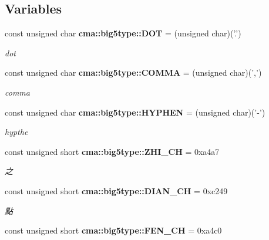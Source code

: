 \subsection*{Variables}
\begin{CompactItemize}
\item 
const unsigned char {\bf cma::big5type::DOT} = (unsigned char)('.')\label{namespacecma_1_1big5type_d58dfc7fdbe5d6db3b5b6dca9772457b}

\begin{CompactList}\small\item\em dot \item\end{CompactList}\item 
const unsigned char {\bf cma::big5type::COMMA} = (unsigned char)(',')\label{namespacecma_1_1big5type_a37bf289465759bf00ac522823ffe49a}

\begin{CompactList}\small\item\em comma \item\end{CompactList}\item 
const unsigned char {\bf cma::big5type::HYPHEN} = (unsigned char)('-')\label{namespacecma_1_1big5type_c0c4db6b61a12155ae0bf7094e687178}

\begin{CompactList}\small\item\em hypthe \item\end{CompactList}\item 
const unsigned short {\bf cma::big5type::ZHI\_\-CH} = 0xa4a7\label{namespacecma_1_1big5type_40ab6efe0f9da7cdd4ccb668839f189c}

\begin{CompactList}\small\item\em 之 \item\end{CompactList}\item 
const unsigned short {\bf cma::big5type::DIAN\_\-CH} = 0xc249\label{namespacecma_1_1big5type_c8d3c97e209a8e236d965b3caa12648b}

\begin{CompactList}\small\item\em 點 \item\end{CompactList}\item 
const unsigned short {\bf cma::big5type::FEN\_\-CH} = 0xa4c0\label{namespacecma_1_1big5type_4dd0b0d33393c2d9a27ccee6ab9662d5}


\end{CompactItemize}
